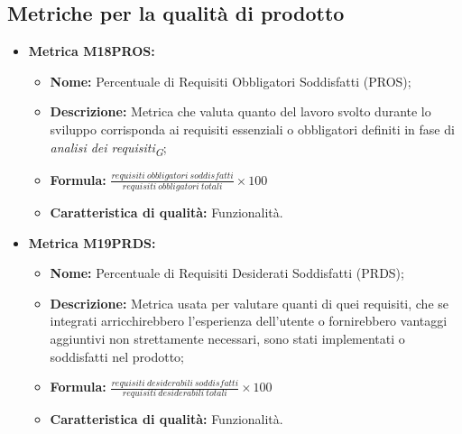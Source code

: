 \subsection{Metriche per la qualità di prodotto}
\begin{itemize}
    
    \item \hypertarget{item:M18PROS}{\textbf{Metrica M18PROS:}}
    \begin{minipage}[t]{0.9\textwidth}
        \begin{itemize}
            \item \textbf{Nome:} Percentuale di Requisiti Obbligatori Soddisfatti (PROS);
            \item \textbf{Descrizione:} Metrica che valuta quanto del lavoro svolto durante lo sviluppo corrisponda ai requisiti essenziali o obbligatori definiti in fase di \textit{analisi dei requisiti}\textsubscript{\textit{G}};
            \item \textbf{Formula:} $\frac{requisiti \ obbligatori \ soddisfatti}{requisiti \ obbligatori \ totali}\times 100$
            \item \textbf{Caratteristica di qualità:} Funzionalità.
        \end{itemize}
    \end{minipage}

    \item \hypertarget{item:M19PRDS}{\textbf{Metrica M19PRDS:}}
    \begin{minipage}[t]{0.9\textwidth}
        \begin{itemize}
            \item \textbf{Nome:} Percentuale di Requisiti Desiderati Soddisfatti (PRDS);
            \item \textbf{Descrizione:} Metrica usata per valutare quanti di quei requisiti, che se integrati arricchirebbero l'esperienza dell'utente o fornirebbero vantaggi aggiuntivi non strettamente necessari, sono stati implementati o soddisfatti nel prodotto;
            \item \textbf{Formula:} $\frac{requisiti \ desiderabili \ soddisfatti}{requisiti \ desiderabili \ totali}\times 100$
            \item \textbf{Caratteristica di qualità:} Funzionalità.
        \end{itemize}
    \end{minipage}


\end{itemize}
